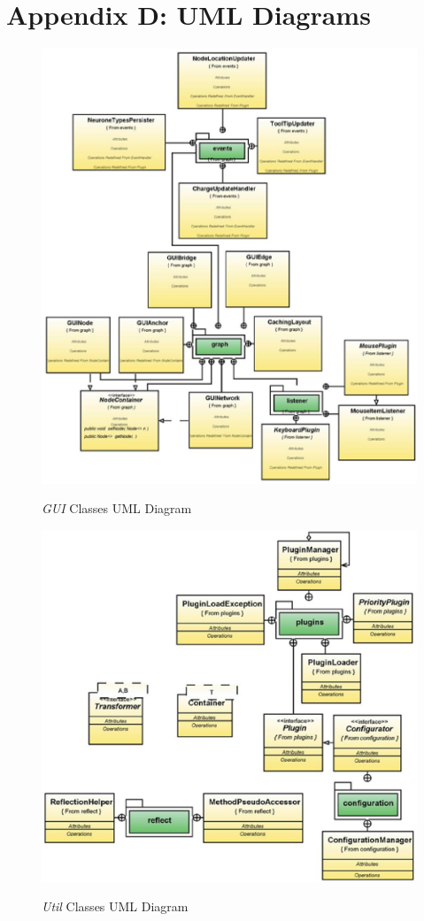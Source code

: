 \documentclass[11pt]{report}
\begin{document}
\newpage
\section{Appendix D: UML Diagrams}
{
\begin{figure}[h]
\centering
\scalebox{0.6} {
	\includegraphics{GUIUML}
}
\caption{{\textit{GUI}} Classes UML Diagram}
\label{fig:gui}
\end{figure}

\begin{figure}[h]
\centering
\scalebox{0.6} {
	\includegraphics{UtilUML}
}
\caption{{\textit{Util}} Classes UML Diagram}
\label{fig:util}
\end{figure}

}
\end{document}
